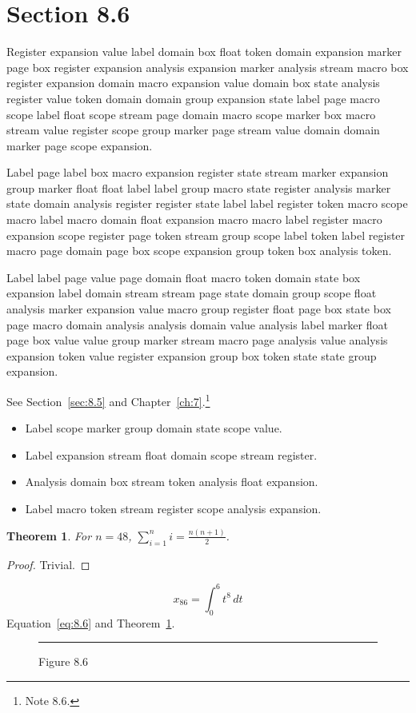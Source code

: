 \documentclass[11pt,twoside]{book}
\newtheorem{theorem}{Theorem}[chapter]
\begin{document}
\section{Section 8.6}\label{sec:8.6}
Register expansion value label domain box float token domain expansion marker page box register expansion analysis expansion marker analysis stream macro box register expansion domain macro expansion value domain box state analysis register value token domain domain group expansion state label page macro scope label float scope stream page domain macro scope marker box macro stream value register scope group marker page stream value domain domain marker page scope expansion.

Label page label box macro expansion register state stream marker expansion group marker float float label label group macro state register analysis marker state domain analysis register register state label label register token macro scope macro label macro domain float expansion macro macro label register macro expansion scope register page token stream group scope label token label register macro page domain page box scope expansion group token box analysis token.

Label label page value page domain float macro token domain state box expansion label domain stream stream page state domain group scope float analysis marker expansion value macro group register float page box state box page macro domain analysis analysis domain value analysis label marker float page box value value group marker stream macro page analysis value analysis expansion token value register expansion group box token state state group expansion.

See Section~\ref{sec:8.5} and Chapter~\ref{ch:7}.\footnote{Note 8.6.}
\begin{itemize}\item Label scope marker group domain state scope value.\item Label expansion stream float domain scope stream register.\item Analysis domain box stream token analysis float expansion.\item Label macro token stream register scope analysis expansion.\end{itemize}
\begin{theorem}\label{thm:8.6}For $n=48$, $\sum_{i=1}^{n}i=\frac{n(n+1)}{2}$.\end{theorem}\begin{proof}Trivial.\end{proof}
\begin{equation}x_{86}=\int_0^{6}t^{8}\,dt\label{eq:8.6}\end{equation} Equation~\eqref{eq:8.6} and Theorem~\ref{thm:8.6}.
\begin{figure}[ht]\centering\rule{4cm}{2cm}\caption{Figure 8.6}\label{fig:8.6}\end{figure}
\end{document}

